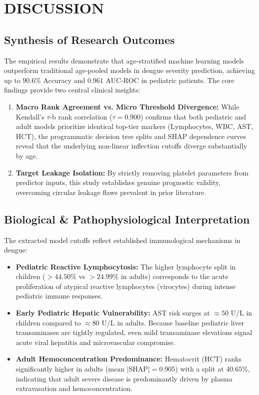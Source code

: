 \documentclass[12pt, a4paper]{report}
\begin{document}
\chapter{DISCUSSION}

\section{Synthesis of Research Outcomes}
The empirical results demonstrate that age-stratified machine learning models outperform traditional age-pooled models in dengue severity prediction, achieving up to $90.6\%$ Accuracy and $0.961$ AUC-ROC in pediatric patients. The core findings provide two central clinical insights:
\begin{enumerate}
    \item \textbf{Macro Rank Agreement vs. Micro Threshold Divergence:} While Kendall's $\tau$-b rank correlation ($\tau = 0.900$) confirms that both pediatric and adult models prioritize identical top-tier markers (Lymphocytes, WBC, AST, HCT), the programmatic decision tree splits and SHAP dependence curves reveal that the underlying non-linear inflection cutoffs diverge substantially by age.
    \item \textbf{Target Leakage Isolation:} By strictly removing platelet parameters from predictor inputs, this study establishes genuine prognostic validity, overcoming circular leakage flaws prevalent in prior literature.
\end{enumerate}

\section{Biological \& Pathophysiological Interpretation}
The extracted model cutoffs reflect established immunological mechanisms in dengue:
\begin{itemize}
    \item \textbf{Pediatric Reactive Lymphocytosis:} The higher lymphocyte split in children ($> 44.50\%$ vs $> 24.99\%$ in adults) corresponds to the acute proliferation of atypical reactive lymphocytes (virocytes) during intense pediatric immune responses.
    \item \textbf{Early Pediatric Hepatic Vulnerability:} AST risk surges at $\approx 50\text{ U/L}$ in children compared to $\approx 80\text{ U/L}$ in adults. Because baseline pediatric liver transaminases are tightly regulated, even mild transaminase elevations signal acute viral hepatitis and microvascular compromise.
    \item \textbf{Adult Hemoconcentration Predominance:} Hematocrit ($\text{HCT}$) ranks significantly higher in adults ($\text{mean } |\text{SHAP}| = 0.905$) with a split at $40.65\%$, indicating that adult severe disease is predominantly driven by plasma extravasation and hemoconcentration.
\end{itemize}
\end{document}
